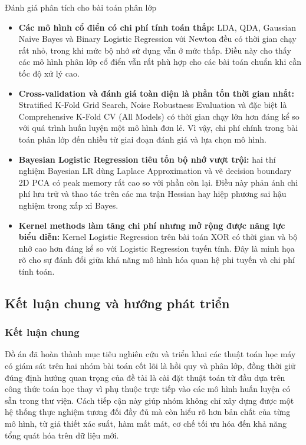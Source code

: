 \begin{warningbox}{Đánh giá phân tích cho bài toán phân lớp}
\begin{itemize}[labelsep=10pt, leftmargin=1.8cm]
    \item \textbf{Các mô hình cổ điển có chi phí tính toán thấp:} LDA, QDA, Gaussian Naive Bayes và Binary Logistic Regression với Newton đều có thời gian chạy rất nhỏ, trong khi mức bộ nhớ sử dụng vẫn ở mức thấp. Điều này cho thấy các mô hình phân lớp cổ điển vẫn rất phù hợp cho các bài toán chuẩn khi cần tốc độ xử lý cao.

    \item \textbf{Cross-validation và đánh giá toàn diện là phần tốn thời gian nhất:} Stratified K-Fold Grid Search, Noise Robustness Evaluation và đặc biệt là Comprehensive K-Fold CV (All Models) có thời gian chạy lớn hơn đáng kể so với quá trình huấn luyện một mô hình đơn lẻ. Vì vậy, chi phí chính trong bài toán phân lớp đến nhiều từ giai đoạn đánh giá và lựa chọn mô hình.

    \item \textbf{Bayesian Logistic Regression tiêu tốn bộ nhớ vượt trội:} hai thí nghiệm Bayesian LR dùng Laplace Approximation và vẽ decision boundary 2D PCA có peak memory rất cao so với phần còn lại. Điều này phản ánh chi phí lưu trữ và thao tác trên các ma trận Hessian hay hiệp phương sai hậu nghiệm trong xấp xỉ Bayes.

    \item \textbf{Kernel methods làm tăng chi phí nhưng mở rộng được năng lực biểu diễn:} Kernel Logistic Regression trên bài toán XOR có thời gian và bộ nhớ cao hơn đáng kể so với Logistic Regression tuyến tính. Đây là minh họa rõ cho sự đánh đổi giữa khả năng mô hình hóa quan hệ phi tuyến và chi phí tính toán.
\end{itemize}
\end{warningbox}

\subsection{Kết luận chung và hướng phát triển}

\subsubsection{Kết luận chung}

Đồ án đã hoàn thành mục tiêu nghiên cứu và triển khai các thuật toán học máy có giám sát trên hai nhóm bài toán cốt lõi là hồi quy và phân lớp, đồng thời giữ đúng định hướng quan trọng của đề tài là cài đặt thuật toán từ đầu dựa trên công thức toán học thay vì phụ thuộc trực tiếp vào các mô hình huấn luyện có sẵn trong thư viện. Cách tiếp cận này giúp nhóm không chỉ xây dựng được một hệ thống thực nghiệm tương đối đầy đủ mà còn hiểu rõ hơn bản chất của từng mô hình, từ giả thiết xác suất, hàm mất mát, cơ chế tối ưu hóa đến khả năng tổng quát hóa trên dữ liệu mới.

